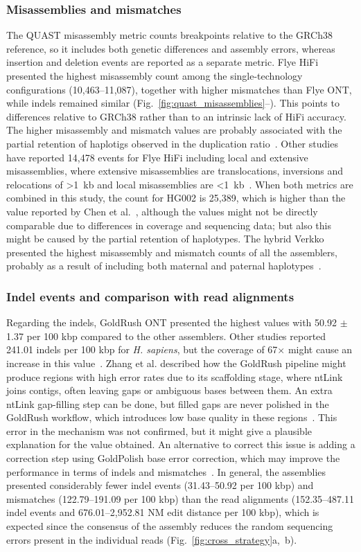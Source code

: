 \documentclass[12pt, letterpaper]{article}
\begin{document}
\subsubsection{Misassemblies and mismatches}
The QUAST misassembly metric counts breakpoints relative to the GRCh38 reference, so it includes both genetic differences and assembly errors, whereas insertion and deletion events are reported as a separate metric. Flye HiFi presented the highest misassembly count among the single-technology configurations (10,463--11,087), together with higher mismatches than Flye ONT, while indels remained similar (Fig.~\ref{fig:quast_misassemblies}--). This points to differences relative to GRCh38 rather than to an intrinsic lack of HiFi accuracy. The higher misassembly and mismatch values are probably associated with the partial retention of haplotigs observed in the duplication ratio~\cite{Wong2023,Munoz2025}. Other studies have reported 14,478 events for Flye HiFi including local and extensive misassemblies, where extensive misassemblies are translocations, inversions and relocations of >1~kb and local misassemblies are <1~kb~\cite{Chen2021}. When both metrics are combined in this study, the count for HG002 is 25,389, which is higher than the value reported by Chen et al.~\cite{Chen2021}, although the values might not be directly comparable due to differences in coverage and sequencing data; but also this might be caused by the partial retention of haplotypes. The hybrid Verkko presented the highest misassembly and mismatch counts of all the assemblers, probably as a result of including both maternal and paternal haplotypes~\cite{Rautiainen2023}.

\subsubsection{Indel events and comparison with read alignments}
Regarding the indels, GoldRush ONT presented the highest values with 50.92 $\pm$ 1.37 per 100 kbp compared to the other assemblers. Other studies reported 241.01 indels per 100 kbp for \textit{H. sapiens}, but the coverage of 67$\times$ might cause an increase in this value~\cite{Kazemi2026}. Zhang et al. described how the GoldRush pipeline might produce regions with high error rates due to its scaffolding stage, where ntLink joins contigs, often leaving gaps or ambiguous bases between them. An extra ntLink gap-filling step can be done, but filled gaps are never polished in the GoldRush workflow, which introduces low base quality in these regions~\cite{Zhang2025}. This error in the mechanism was not confirmed, but it might give a plausible explanation for the value obtained. An alternative to correct this issue is adding a correction step using GoldPolish base error correction, which may improve the performance in terms of indels and mismatches~\cite{Zhang2025}. In general, the assemblies presented considerably fewer indel events (31.43--50.92 per 100 kbp) and mismatches (122.79--191.09 per 100 kbp) than the read alignments (152.35--487.11 indel events and 676.01--2,952.81 NM edit distance per 100 kbp), which is expected since the consensus of the assembly reduces the random sequencing errors present in the individual reads (Fig.~\ref{fig:cross_strategy}a,~b).
\end{document}
